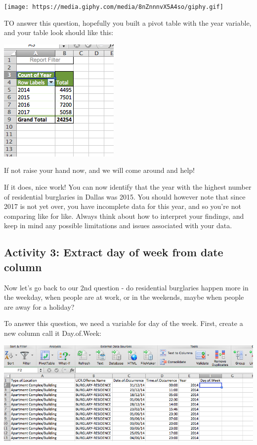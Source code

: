 \documentclass[]{book}
\theoremstyle{definition}
\theoremstyle{definition}
\theoremstyle{definition}
\theoremstyle{remark}
\begin{document}
\texttt{[image: https://media.giphy.com/media/8nZnnnvX5A4so/giphy.gif]}

TO answer this question, hopefully you built a pivot table with the year
variable, and your table look should like this:

\includegraphics{imgs/count_of_yr.png}

If not raise your hand now, and we will come around and help!

If it does, nice work! You can now identify that the year with the
highest number of residential burglaries in Dallas was 2015. You should
however note that since 2017 is not yet over, you have incomplete data
for this year, and so you're not comparing like for like. Always think
about how to interpret your findings, and keep in mind any possible
limitations and issues associated with your data.

\hypertarget{activity-3-extract-day-of-week-from-date-column}{%
\subsection{Activity 3: Extract day of week from date
column}\label{activity-3-extract-day-of-week-from-date-column}}

Now let's go back to our 2nd question - do residential burglaries happen
more in the weekday, when people are at work, or in the weekends, maybe
when people are away for a holiday?

 To answer this question, we need a variable for day of the week. First,
create a new column call it Day.of.Week:

\includegraphics{imgs/create_day_of_wk_col.png}
\end{document}
